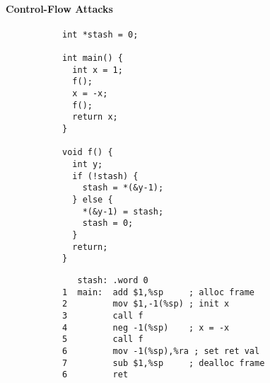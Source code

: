 \documentclass[acmsmall,review,anonymous]{acmart}\settopmatter{printfolios=true,printccs=false,printacmref=false}
\begin{document}
\paragraph*{Control-Flow Attacks}
\begin{figure}
  \centering
  \begin{subfigure}{.2\textwidth}
{\footnotesize
\begin{verbatim}
int *stash = 0;

int main() {
  int x = 1;
  f();
  x = -x;
  f();
  return x;
}

void f() {
  int y;
  if (!stash) {
    stash = *(&y-1);
  } else {
    *(&y-1) = stash;
    stash = 0;
  }
  return;
}
\end{verbatim}
}
\end{subfigure}
  \begin{subfigure}{.4\textwidth}
{\footnotesize
\begin{verbatim}
   stash: .word 0
1  main:  add $1,%sp     ; alloc frame
2         mov $1,-1(%sp) ; init x
3         call f
4         neg -1(%sp)    ; x = -x
5         call f
6         mov -1(%sp),%ra ; set ret val
7         sub $1,%sp     ; dealloc frame
6         ret


\end{verbatim}}
\end{subfigure}
\end{figure}
\end{document}

